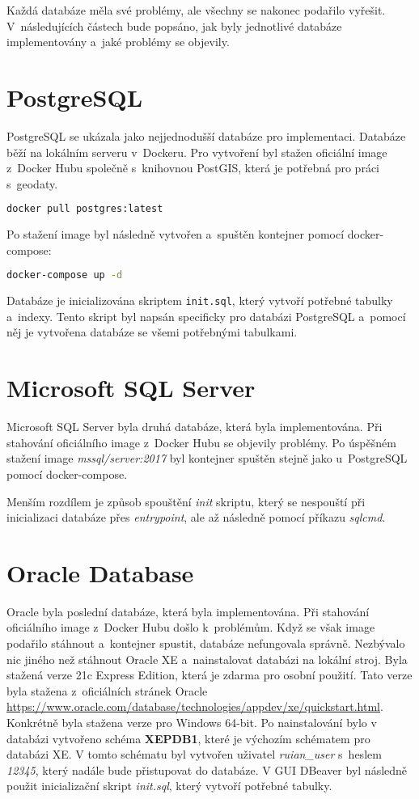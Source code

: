 Každá databáze měla své problémy, ale všechny se nakonec podařilo vyřešit.
V~následujících částech bude popsáno, jak byly jednotlivé databáze implementovány a~jaké problémy se objevily.

\section{PostgreSQL}
PostgreSQL se ukázala jako nejjednodušší databáze pro implementaci.
Databáze běží na lokálním serveru v~Dockeru.
Pro vytvoření byl stažen oficiální image z~Docker Hubu
společně s~knihovnou PostGIS, která je potřebná pro práci s~geodaty.

\begin{lstlisting}[language=bash]
docker pull postgres:latest
\end{lstlisting}

Po stažení image byl následně vytvořen a~spuštěn kontejner pomocí docker-compose:

\begin{lstlisting}[language=bash]
docker-compose up -d
\end{lstlisting}

Databáze je inicializována skriptem \texttt{init.sql}, který vytvoří potřebné tabulky a~indexy.
Tento skript byl napsán specificky pro databázi PostgreSQL a~pomocí něj je vytvořena databáze
se všemi potřebnými tabulkami.

\section{Microsoft SQL Server}
Microsoft SQL Server byla druhá databáze, která byla implementována.
Při stahování oficiálního image z~Docker Hubu se objevily problémy.
Po úspěšném stažení image \textit{mssql/server:2017} byl kontejner spuštěn stejně jako u~PostgreSQL
pomocí docker-compose.

Menším rozdílem je způsob spouštění \textit{init} skriptu, který se nespouští při inicializaci databáze
přes \textit{entrypoint}, ale až následně pomocí příkazu \textit{sqlcmd}.

\newpage

\section{Oracle Database}
Oracle byla poslední databáze, která byla implementována.
Při stahování oficiálního image z~Docker Hubu došlo k~problémům.
Když se však image podařilo stáhnout a~kontejner spustit, databáze nefungovala správně.
Nezbývalo nic jiného než stáhnout Oracle XE a~nainstalovat databázi na lokální stroj.
Byla stažená verze 21c Express Edition, která je zdarma pro osobní použití.
Tato verze byla stažena z~oficiálních stránek Oracle
\url{https://www.oracle.com/database/technologies/appdev/xe/quickstart.html}.
Konkrétně byla stažena verze pro Windows 64-bit.
Po nainstalování bylo v databázi vytvořeno schéma \textbf{XEPDB1}, které je výchozím
schématem pro databázi XE. V tomto schématu byl vytvořen uživatel \textit{ruian\_user} s~heslem \textit{12345},
který nadále bude přistupovat do databáze.
V GUI DBeaver byl následně použit inicializační skript \textit{init.sql},
který vytvoří potřebné tabulky.


